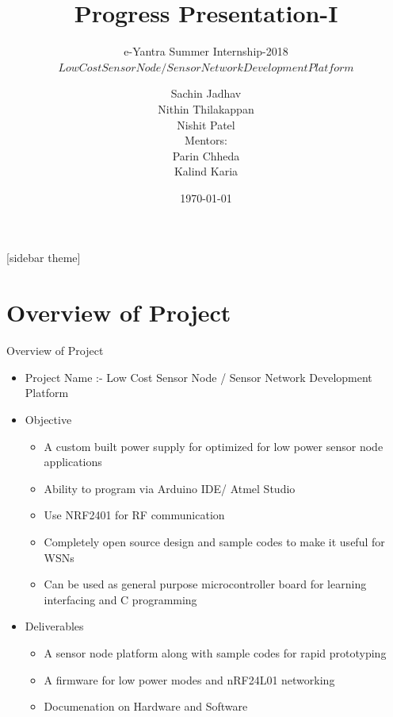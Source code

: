 \documentclass[10pt, a4paper]{beamer}
\begin{document}
	\title{Progress Presentation-I}
	\subtitle{e-Yantra Summer Internship-2018 \\ $Low Cost Sensor Node / Sensor Network Development Platform$}
	\author{Sachin Jadhav\\Nithin Thilakappan\\Nishit Patel\\
	Mentors:\\ Parin Chheda\\Kalind Karia}
	\date{\today}
	\frame{\titlepage}

[sidebar theme]
\section{Overview of Project}
\begin{frame}{Overview of Project}
	\begin{itemize}
		\item Project Name :- Low Cost Sensor Node / Sensor Network Development Platform 
		\item Objective
        	\begin{itemize}
        		\item A custom built power supply for optimized for low power sensor node applications
				\item Ability to program via Arduino IDE/ Atmel Studio
				\item Use NRF2401 for RF communication
				\item Completely open source design and sample codes to make it useful for WSNs
				\item Can be used as general purpose microcontroller board for learning interfacing and C
programming
                \end{itemize}
		\item Deliverables
        \begin{itemize}
        		\item A sensor node platform along with sample codes for rapid prototyping
				\item A firmware for low power modes and nRF24L01 networking
				\item Documenation on Hardware and Software
			
                \end{itemize} 
	\end{itemize}
\end{frame}
\end{document}
